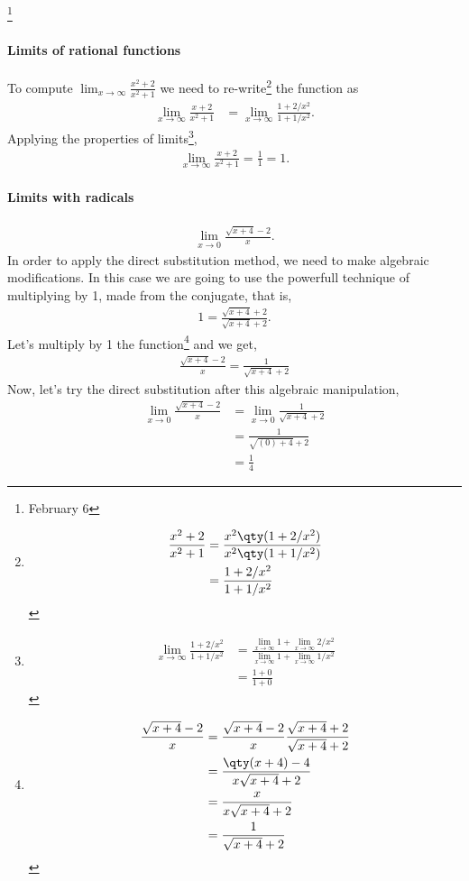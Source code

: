 \documentclass[../main-notes.tex]{subfile}
\begin{document}
\footnote{February 6}

\paragraph{Limits of rational functions}
To compute \(\lim_{x\to\infty}\frac{x^2+2}{x^2+1}\) we need to re-write\footnote{
    \begin{align*}
        \frac{x^2+2}{x^2+1} &= \frac{x^2\qty(1+2/x^2)}{x^2\qty(1+1/x^2)} \\
                        &= \frac{1+2/x^2}{1+1/x^2}
    \end{align*}
} the function as 
\begin{align*}
     \lim_{x\to\infty}\frac{x+2}{x^2+1}&= \lim_{x\to\infty}\frac{1+2/x^2}{1+1/x^2}.
\end{align*}
Applying the properties of limits\footnote{
    \begin{align*}
        \lim_{x\to\infty}\frac{1+2/x^2}{1+1/x^2} &= \frac{\lim_{x\to\infty}1+\lim_{x\to\infty}2/x^2}{\lim_{x\to\infty}1+\lim_{x\to\infty}1/x^2} \\
                                             &= \frac{1+0}{1+0}
    \end{align*}
},
\begin{gather*}
     \lim_{x\to\infty}\frac{x+2}{x^2+1}= \frac{1}{1} = 1.
\end{gather*}

\paragraph{Limits with radicals}
\begin{gather*}
    \lim_{x\to0}\frac{\sqrt{x+4}-2}{x}.
\end{gather*}
In order to apply the direct substitution method, we need to make algebraic modifications.
In this case we are going to use the powerfull technique of multiplying by \num{1}, made from the conjugate, that is,
\begin{gather*}
    1 = \frac{\sqrt{x+4}+2}{\sqrt{x+4}+2}.
\end{gather*}
Let's multiply by \num{1} the function\footnote{
    \begin{align*}
    \frac{\sqrt{x+4}-2}{x} &= \frac{\sqrt{x+4}-2}{x}\frac{\sqrt{x+4}+2}{\sqrt{x+4}+2} \\
                           &= \frac{\qty(x+4)-4}{x\sqrt{x+4}+2} \\
                           &= \frac{x}{x\sqrt{x+4}+2} \\
                           &=\frac{1}{\sqrt{x+4}+2}
    \end{align*}
} and we get,
\begin{align*}
    \frac{\sqrt{x+4}-2}{x} =\frac{1}{\sqrt{x+4}+2}
\end{align*}
Now, let's try the direct substitution after this algebraic manipulation,
\begin{align*}
    \lim_{x\to0}\frac{\sqrt{x+4}-2}{x} &= \lim_{x\to0}\frac{1}{\sqrt{x+4}+2} \\
                                       &= \frac{1}{\sqrt{(0)+4}+2} \\
                                       &= \frac{1}{4}
\end{align*}
\end{document}
